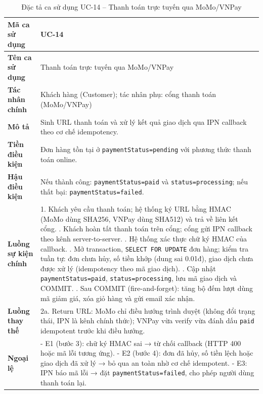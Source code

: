 \begin{longtable}{|p{3cm}|p{10.5cm}|}
  \caption{Đặc tả ca sử dụng UC-14 -- Thanh toán trực tuyến qua MoMo\slash VNPay}
  \label{tab:uc_spec_14} \\
  \hline
  \textbf{Mã ca sử dụng} & UC-14 \\ \hline
  \textbf{Tên ca sử dụng} & Thanh toán trực tuyến qua MoMo\slash VNPay \\ \hline
  \textbf{Tác nhân chính} & Khách hàng (Customer); tác nhân phụ: cổng thanh toán (MoMo\slash VNPay) \\ \hline
  \textbf{Mô tả} & Sinh URL thanh toán và xử lý kết quả giao dịch qua IPN callback theo cơ chế idempotency. \\ \hline
  \textbf{Tiền điều kiện} & Đơn hàng tồn tại ở \texttt{paymentStatus=pending} với phương thức thanh toán online. \\ \hline
  \textbf{Hậu điều kiện} & Nếu thành công: \texttt{paymentStatus=paid} và \texttt{status=processing}; nếu thất bại: \texttt{paymentStatus=failed}. \\ \hline
  \textbf{Luồng sự kiện chính} &
  1. Khách yêu cầu thanh toán; hệ thống ký URL bằng HMAC (MoMo dùng SHA256, VNPay dùng SHA512) và trả về liên kết cổng. \newline
  2. Khách hoàn tất thanh toán trên cổng; cổng gửi IPN callback theo kênh server-to-server. \newline
  3. Hệ thống xác thực chữ ký HMAC của callback. \newline
  4. Mở transaction, \texttt{SELECT FOR UPDATE} đơn hàng; kiểm tra tuần tự: đơn chưa hủy, số tiền khớp (dung sai 0.01đ), giao dịch chưa được xử lý (idempotency theo mã giao dịch). \newline
  5. Cập nhật \texttt{paymentStatus=paid}, \texttt{status=processing}, lưu mã giao dịch và COMMIT. \newline
  6. Sau COMMIT (fire-and-forget): tăng bộ đếm lượt dùng mã giảm giá, xóa giỏ hàng và gửi email xác nhận. \\ \hline
  \textbf{Luồng thay thế} & 2a. Return URL: MoMo chỉ điều hướng trình duyệt (không đổi trạng thái, IPN là kênh chính thức); VNPay vừa verify vừa đánh dấu \texttt{paid} idempotent trước khi điều hướng. \\ \hline
  \textbf{Ngoại lệ} &
  - E1 (bước 3): chữ ký HMAC sai → từ chối callback (HTTP 400 hoặc mã lỗi tương ứng). \newline
  - E2 (bước 4): đơn đã hủy, số tiền lệch hoặc giao dịch đã xử lý → bỏ qua an toàn nhờ cơ chế idempotent. \newline
  - E3: IPN báo mã lỗi → đặt \texttt{paymentStatus=failed}, cho phép người dùng thanh toán lại. \\ \hline
\end{longtable}

